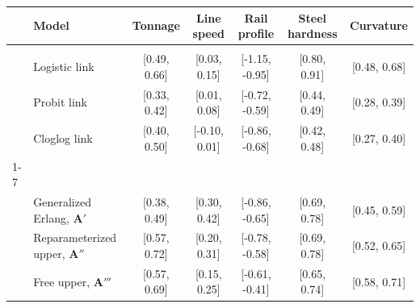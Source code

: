 \begin{tabular}[t]{>{}llccccc}
\toprule
 & Model & Tonnage & Line speed & Rail profile & Steel hardness & Curvature\\
\midrule
\addlinespace[0.3em]
\multicolumn{7}{l}{\textbf{\textbf{Cumulative link}}}\\
\hspace{1em} & Logistic link & {}[0.49, 0.66] & {}[0.03, 0.15] & {}[-1.15, -0.95] & {}[0.80, 0.91] & {}[0.48, 0.68]\\

\hspace{1em} & Probit link & {}[0.33, 0.42] & {}[0.01, 0.08] & {}[-0.72, -0.59] & {}[0.44, 0.49] & {}[0.28, 0.39]\\

\hspace{1em} & Cloglog link & {}[0.40, 0.50] & {}[-0.10, 0.01] & {}[-0.86, -0.68] & {}[0.42, 0.48] & {}[0.27, 0.40]\\
\cmidrule{1-7}
\addlinespace[0.3em]
\multicolumn{7}{l}{\textbf{\textbf{Markov jump process}}}\\
\hspace{1em} & Generalized Erlang, $\bm{A}'$ & {}[0.38, 0.49] & {}[0.30, 0.42] & {}[-0.86, -0.65] & {}[0.69, 0.78] & {}[0.45, 0.59]\\

\hspace{1em} & Reparameterized upper, $\bm{A}''$ & {}[0.57, 0.72] & {}[0.20, 0.31] & {}[-0.78, -0.58] & {}[0.69, 0.78] & {}[0.52, 0.65]\\

\hspace{1em} & Free upper, $\bm{A}'''$ & {}[0.57, 0.69] & {}[0.15, 0.25] & {}[-0.61, -0.41] & {}[0.65, 0.74] & {}[0.58, 0.71]\\
\bottomrule
\end{tabular}